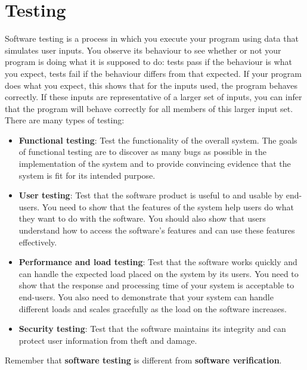 \documentclass[10pt,a4paper]{report}
\begin{document}
\chapter{Testing}
Software testing is a process in which you execute your program using data that simulates user inputs. You observe its behaviour to see whether or not your program is doing
what it is supposed to do: tests pass if the behaviour is what you expect, tests fail if the behaviour differs from that expected. If your program does what you expect, this shows that for the inputs used, the program behaves correctly.
If these inputs are representative of a larger set of inputs, you can infer that the program will behave correctly for all members of this larger input set.\\
There are many types of testing:
\begin{itemize}
	\item \textbf{Functional testing}: Test the functionality of the overall system. The goals of functional testing are to
	discover as many bugs as possible in the implementation of the system and to provide
	convincing evidence that the system is fit for its intended purpose.
	\item \textbf{User testing}: Test that the software product is useful to and usable by end-users. You need to show
	that the features of the system help users do what they want to do with the software.
	You should also show that users understand how to access the software’s features
	and can use these features effectively.
	\item \textbf{Performance and load testing}: Test that the software works quickly and can handle the expected load placed on the
	system by its users. You need to show that the response and processing time of your
	system is acceptable to end-users. You also need to demonstrate that your system
	can handle different loads and scales gracefully as the load on the software increases.
	\item \textbf{Security testing}: Test that the software maintains its integrity and can protect user information from theft
	and damage.
\end{itemize}
Remember that \textbf{software testing} is different from \textbf{software verification}.
\end{document}
